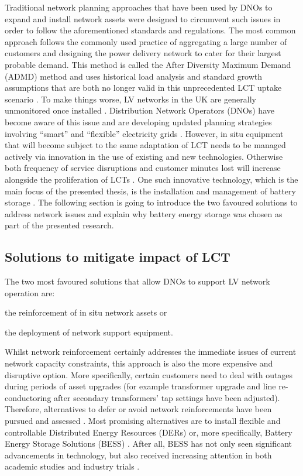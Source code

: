 Traditional network planning approaches that have been used by DNOs to expand and install network assets were designed to circumvent such issues in order to follow the aforementioned standards and regulations.
The most common approach follows the commonly used practice of aggregating a large number of customers and designing the power delivery network to cater for their largest probable demand.
This method is called the After Diversity Maximum Demand (ADMD) method \cite{Richardson2010a} and uses historical load analysis and standard growth assumptions that are both no longer valid in this unprecedented LCT uptake scenario \cite{Yunusov2016}.
To make things worse, LV networks in the UK are generally unmonitored once installed \cite{Yunusov2016}.
Distribution Network Operators (DNOs) have become aware of this issue and are developing updated planning strategies involving ``smart'' and ``flexible'' electricity grids \cite{Fang2012}.
However, in situ equipment that will become subject to the same adaptation of LCT needs to be managed actively via innovation in the use of existing and new technologies.
Otherwise both frequency of service disruptions and customer minutes lost will increase alongside the proliferation of LCTs \cite{Ault2008a}.
One such innovative technology, which is the main focus of the presented thesis, is the installation and management of battery storage \cite{Chen2009}.
The following section is going to introduce the two favoured solutions to address network issues and explain why battery energy storage was chosen as part of the presented research.


\subsection{Solutions to mitigate impact of LCT}
\label{ch-introduction:subsec:solutions-to-mitigate-impact-of-lct}

The two most favoured solutions that allow DNOs to support LV network operation are:
\begin{enumerate*}
	\item the reinforcement of in situ network assets or
	\item the deployment of network support equipment.
\end{enumerate*}
Whilst network reinforcement certainly addresses the immediate issues of current network capacity constraints, this approach is also the more expensive and disruptive option.
More specifically, certain customers need to deal with outages during periods of asset upgrades (for example transformer upgrade and line re-conductoring after secondary transformers' tap settings have been adjusted).
Therefore, alternatives to defer or avoid network reinforcements have been pursued and assessed \cite{Harrison2007, Zangs2016a, VanderKlauw2016d, Greenwood2017}.
Most promising alternatives are to install flexible and controllable Distributed Energy Resources (DERs) or, more specifically, Battery Energy Storage Solutions (BESS) \cite{Wade2010}.
After all, BESS has not only seen significant advancements in technology, but also received increasing attention in both academic studies and industry trials \cite{Palizban2016}.

